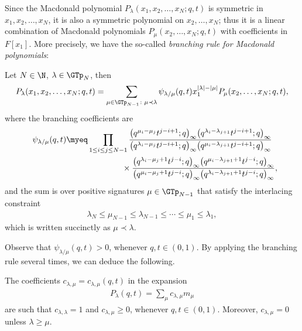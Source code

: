 Since the Macdonald polynomial $P_{\lambda}(x_1, x_2, \dots, x_N; q, t)$ is symmetric in $x_1, x_2, \dots, x_N$, it is also a symmetric polynomial on $x_2, \dots, x_N$; thus it is a linear combination of Macdonald polynomials $P_{\mu}(x_2, \dots, x_N; q, t)$ with coef\/f\/icients in $F[x_1]$. More precisely, we have the so-called \textit{branching rule for Macdonald polynomials}:

\begin{thm}\label{branchingmacdonald}
Let $N\in\N$, $\lambda\in\GTp_N$, then
\begin{gather*}
P_{\lambda}(x_1, x_2, \dots, x_N; q, t) = \sum_{\mu \in\GTp_{N-1}\colon \mu\prec\lambda}{\psi_{\lambda/\mu}(q, t)x_1^{|\lambda| - |\mu|}P_{\mu}(x_2, \dots, x_N; q, t)},
\end{gather*}
where the branching coefficients are
\begin{gather*}
\psi_{\lambda/\mu}(q, t) \myeq \prod_{1\leq i \leq j\leq N-1}\frac{\big(q^{\mu_i - \mu_j}t^{j-i+1}; q\big)_{\infty}\big(q^{\lambda_i - \lambda_{j+1}}t^{j-i+1}; q\big)_{\infty} }
{\big(q^{\lambda_i - \mu_j}t^{j-i+1}; q\big)_{\infty}\big(q^{\mu_i - \lambda_{j+1}}t^{j-i+1}; q\big)_{\infty} }\\
\hphantom{\psi_{\lambda/\mu}(q, t) \myeq \prod_{1\leq i \leq j\leq N-1}}{} \times \frac{\big(q^{\lambda_i - \mu_j+1}t^{j-i}; q\big)_{\infty}\big(q^{\mu_i - \lambda_{j+1} + 1}t^{j-i}; q\big)_{\infty}}{\big(q^{\mu_i - \mu_j+1}t^{j-i}; q\big)_{\infty}\big(q^{\lambda_i - \lambda_{j+1}+1}t^{j-i}; q\big)_{\infty}} ,
\end{gather*}
and the sum is over positive signatures $\mu\in\GTp_{N-1}$ that satisfy the interlacing constraint
\begin{gather*}
\lambda_N \leq \mu_{N-1} \leq \lambda_{N-1} \leq \cdots \leq \mu_1 \leq \lambda_1,
\end{gather*}
which is written succinctly as $\mu\prec\lambda$.
\end{thm}

Observe that $\psi_{\lambda/\mu}(q, t) > 0$, whenever $q, t \in (0, 1)$. By applying the branching rule several times, we can deduce the following.

\begin{cor}\label{cor:branchingrule}
The coefficients $c_{\lambda, \mu} = c_{\lambda, \mu}(q, t)$ in the expansion
\begin{gather*}
P_{\lambda}(q, t) = \sum_{\mu}{c_{\lambda, \mu}m_{\mu}}
\end{gather*}
are such that $c_{\lambda, \lambda} = 1$ and $c_{\lambda, \mu} \geq 0$, whenever $q, t \in (0, 1)$. Moreover, $c_{\lambda, \mu} = 0$ unless $\lambda \geq \mu$.
\end{cor}

